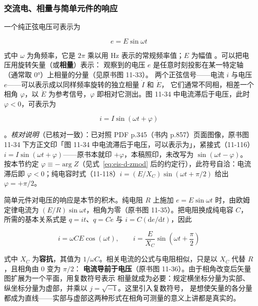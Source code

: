 \subsubsection{交流电、相量与简单元件的响应}

一个纯正弦电压可表示为

\begin{equation}
e=E\sin\omega t
\label{eq:eis-d-sine}
\end{equation}

式中 $\omega$ 为角频率，它是 $2\pi$ 乘以用 Hz 表示的常规频率值；$E$ 为幅值
。可以把电压用旋转矢量（或\textbf{相量}）表示：
观察到的电压 $e$ 是任意时刻投影在某一特定轴（通常取 $0$°）上相量的分量（见原书图 11-33）。
两个正弦信号——电流 $i$ 与电压 $e$——可以表示成以同样频率旋转的独立相量 $\dot I$ 和 $\dot E$，
它们通常不同相，相差一个相角 $\varphi$，以 $\dot E$ 为参考信号，$\varphi$ 即相对它测出。图 11-34
中电流滞后于电压，此时 $\varphi<0$，可表示为

\begin{equation}
i=I\sin(\omega t+\varphi)
\label{eq:eis-d-phase}
\end{equation}

。\emph{核对说明}（已核对一致）：已对照 PDF p.345（书内 p.857）页面图像，原书图 11-34 下方正文印「图 11-34 中电流滞后于电压，可以表示为」，紧接式（11-116）$i=I\sin(\omega t+\varphi)$——原书本就印 $+\varphi$，本稿照印，未改写为 $\sin(\omega t-\varphi)$。按本节约定 $\varphi\equiv-\arg Z$（见式~\eqref{eq:eis-d-zmod} 后的约定行），此符号自洽：电流滞后即 $\varphi<0$；纯电容时式（11-118）$i=(E/X_C)\sin(\omega t+\pi/2)$ 给出 $\varphi=+\pi/2$。

简单元件对电压的响应是本节的积木。纯电阻 $R$ 上施加 $e=E\sin\omega t$ 时，由欧姆定律电流为
$(E/R)\sin\omega t$，相角为零（原书图 11-35）。把电阻换成纯电容 $C$，所需的基本关系式是
$q=it$、$q=Ce$ 与 $i=C(\mathrm{d}e/\mathrm{d}t)$，因此

\begin{equation}
i=\omega CE\cos(\omega t),\qquad
i=\frac{E}{X_C}\sin\!\left(\omega t+\frac{\pi}{2}\right)
\label{eq:eis-d-cap}
\end{equation}

式中 $X_C$ 为\textbf{容抗}，其值为 $1/\omega C$。相关电流的公式与电阻相似，只是以 $X_C$ 代替 $R$，且相角由 $0$ 变为 $\pi/2$：
\textbf{电流导前于电压}（原书图 11-36）。由于相角改变后矢量图扩展为一个平面，用复数符号表示
相量就成为必要：规定横坐标分量为实部、纵坐标分量为虚部，并乘以 $j=\sqrt{-1}$。这里引入复数符号，
是想使矢量的各分量都成为直线——实部与虚部这两种形式在相角可测量的意义上讲都是真实的。

